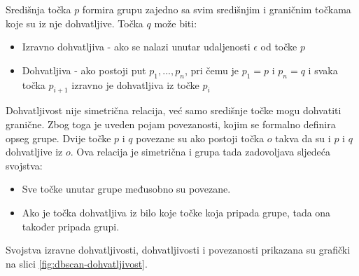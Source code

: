 \documentclass[utf8, diplomski, numeric]{fer}
\begin{document}
Središnja točka $p$ formira grupu zajedno sa svim središnjim i graničnim točkama koje su iz nje dohvatljive. Točka $q$ može biti:
\begin{itemize}
\item Izravno dohvatljiva - ako se nalazi unutar udaljenosti $\epsilon$ od točke $p$
\item Dohvatljiva - ako postoji put $p_1, ..., p_n$, pri čemu je $p_1 = p$ i $p_n = q$ i svaka točka $p_{i+1}$ izravno je dohvatljiva iz točke $p_i$
\end{itemize}

Dohvatljivost nije simetrična relacija, već samo središnje točke mogu dohvatiti granične. Zbog toga je uveden pojam povezanosti, kojim se formalno definira opseg grupe. Dvije točke $p$ i $q$ povezane su ako postoji točka $o$ takva da su i $p$ i $q$ dohvatljive iz $o$. Ova relacija je simetrična i grupa tada zadovoljava sljedeća svojstva:
\begin{itemize}
\item Sve točke unutar grupe međusobno su povezane.
\item Ako je točka dohvatljiva iz bilo koje točke koja pripada grupe, tada ona također pripada grupi.
\end{itemize}

Svojstva izravne dohvatljivosti, dohvatljivosti i povezanosti prikazana su grafički na slici \ref{fig:dbscan-dohvatljivost}.
\end{document}
